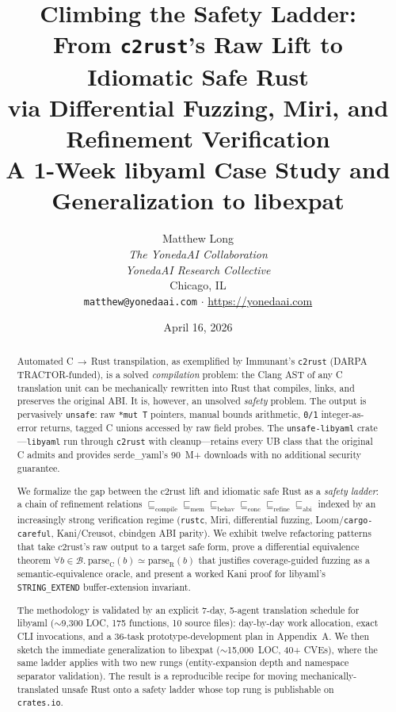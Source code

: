\documentclass[12pt]{article}
\title{\textbf{Climbing the Safety Ladder:}\\
From \texttt{c2rust}'s Raw Lift to Idiomatic Safe Rust\\
via Differential Fuzzing, Miri, and Refinement Verification\\
\large A 1-Week libyaml Case Study and Generalization to libexpat}
\author{Matthew Long \\
\textit{The YonedaAI Collaboration} \\
\textit{YonedaAI Research Collective} \\
Chicago, IL \\
\texttt{matthew@yonedaai.com} $\cdot$ \url{https://yonedaai.com}}
\date{April 16, 2026}
\theoremstyle{definition}
\theoremstyle{remark}
\begin{document}
\maketitle

\begin{abstract}
Automated C\,$\to$\,Rust transpilation, as exemplified by Immunant's
\texttt{c2rust} (DARPA TRACTOR-funded), is a solved \emph{compilation} problem:
the Clang AST of any C translation unit can be mechanically rewritten into
Rust that compiles, links, and preserves the original ABI. It is, however,
an unsolved \emph{safety} problem. The output is pervasively
\texttt{unsafe}: raw \texttt{*mut T} pointers, manual bounds arithmetic,
\texttt{0/1} integer-as-error returns, tagged C unions accessed by raw
field probes. The \texttt{unsafe-libyaml} crate---\texttt{libyaml} run
through \texttt{c2rust} with cleanup---retains every UB class that the
original C admits and provides serde\_yaml's 90~M+ downloads with no
additional security guarantee.

We formalize the gap between the c2rust lift and idiomatic safe Rust as a
\emph{safety ladder}: a chain of refinement relations
$\sqsubseteq_{\mathrm{compile}} \sqsubseteq_{\mathrm{mem}}
\sqsubseteq_{\mathrm{behav}} \sqsubseteq_{\mathrm{conc}}
\sqsubseteq_{\mathrm{refine}} \sqsubseteq_{\mathrm{abi}}$
indexed by an increasingly strong verification regime
(\texttt{rustc}, Miri, differential fuzzing, Loom/\texttt{cargo-careful},
Kani/Creusot, cbindgen ABI parity). We exhibit twelve refactoring patterns
that take c2rust's raw output to a target safe form, prove a differential
equivalence theorem
$\forall b{\in}\mathcal{B}.~\mathrm{parse}_{\mathrm{C}}(b)
 \simeq \mathrm{parse}_{\mathrm{R}}(b)$
that justifies coverage-guided fuzzing as a semantic-equivalence oracle,
and present a worked Kani proof for libyaml's \texttt{STRING\_EXTEND}
buffer-extension invariant.

The methodology is validated by an explicit 7-day, 5-agent translation
schedule for libyaml ($\sim$9{,}300 LOC, 175 functions, 10 source files):
day-by-day work allocation, exact CLI invocations, and a 36-task
prototype-development plan in Appendix~A. We then sketch the immediate
generalization to libexpat ($\sim$15{,}000~LOC, 40+ CVEs), where the same
ladder applies with two new rungs (entity-expansion depth and namespace
separator validation). The result is a reproducible recipe for moving
mechanically-translated unsafe Rust onto a safety ladder whose top rung is
publishable on \texttt{crates.io}.
\end{abstract}
\end{document}

